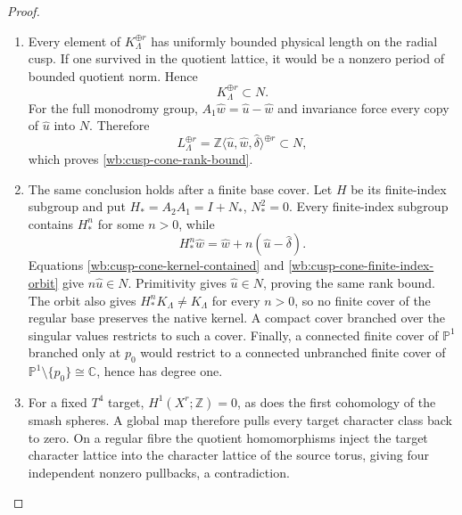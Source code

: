 \begin{proof}
\begin{enumerate}[label=\arabic*.,leftmargin=*]
\item Every element of \(K_\Lambda^{\oplus r}\) has uniformly bounded physical
length on the radial cusp.  If one survived in the quotient lattice, it
would be a nonzero period of bounded quotient norm.  Hence
\begin{equation}
 K_\Lambda^{\oplus r}\subset N.
 \label{wb:cusp-cone-kernel-contained}
\end{equation}
For the full monodromy group,
\(A_1\widehat w=\widehat u-\widehat w\) and invariance force every copy of
\(\widehat u\) into \(N\).  Therefore
\[
 L_\Lambda^{\oplus r}
 =\mathbb Z\langle\widehat u,\widehat w,\widehat\delta\rangle^{\oplus r}
 \subset N,
\]
which proves \cref{wb:cusp-cone-rank-bound}.

\item The same conclusion holds after a finite base cover.  Let \(H\) be its
finite-index subgroup and put \(H_*=A_2A_1=I+N_*\), \(N_*^2=0\).
Every finite-index subgroup contains \(H_*^n\) for some \(n>0\), while
\begin{equation}
 H_*^n\widehat w
 =\widehat w+n(\widehat u-\widehat\delta).
 \label{wb:cusp-cone-finite-index-orbit}
\end{equation}
Equations
\cref{wb:cusp-cone-kernel-contained} and \cref{wb:cusp-cone-finite-index-orbit} give
\(n\widehat u\in N\).  Primitivity gives \(\widehat u\in N\), proving the
same rank bound.  The orbit also gives
\(H_*^nK_\Lambda\ne K_\Lambda\) for every \(n>0\), so no finite cover of
the regular base preserves the native kernel.  A compact cover branched
over the singular values restricts to such a cover.  Finally, a connected
finite cover of \(\mathbb P^1\) branched only at \(p_0\) would restrict to
a connected unbranched finite cover of
\(\mathbb P^1\setminus\{p_0\}\cong\mathbb C\), hence has degree one.

\item For a fixed \(T^4\) target, \(H^1(X^r;\mathbb Z)=0\), as does the first
cohomology of the smash spheres.  A global map therefore pulls every target
character class back to zero.  On a regular fibre the quotient homomorphisms
inject the target character lattice into the character lattice of the
source torus, giving four independent nonzero pullbacks, a contradiction.


\end{enumerate}
\end{proof}
